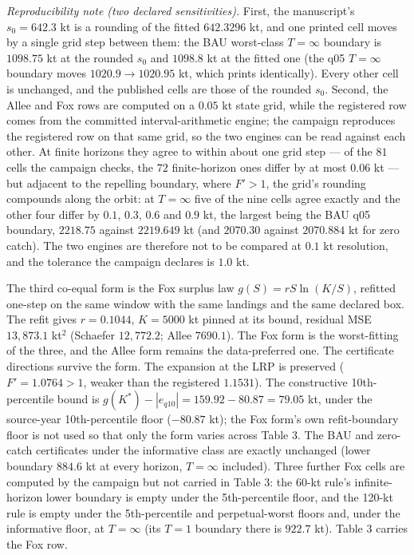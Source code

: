 \documentclass[11pt]{article}
\begin{document}
\emph{Reproducibility note (two declared sensitivities).} First, the
manuscript's \(s_0 = 642.3\) kt is a rounding of the fitted
\(642.3296\) kt, and one printed cell moves by a single grid step between
them: the BAU worst-class \(T=\infty\) boundary is \(1098.75\) kt at the
rounded \(s_0\) and \(1098.8\) kt at the fitted one (the q05
\(T=\infty\) boundary moves \(1020.9 \to 1020.95\) kt, which prints
identically). Every other cell is unchanged, and the published cells are
those of the rounded \(s_0\). Second, the Allee and Fox rows are computed
on a \(0.05\) kt state grid, while the registered row comes from the
committed interval-arithmetic engine; the campaign reproduces the
registered row on that same grid, so the two engines can be read against
each other. At finite horizons they agree to within about one grid step
--- of the \(81\) cells the campaign checks, the \(72\) finite-horizon
ones differ by at most \(0.06\) kt --- but adjacent to the repelling
boundary, where \(F' > 1\), the grid's rounding compounds along the orbit:
at \(T = \infty\) five of the nine cells agree exactly and the other
four differ by \(0.1\), \(0.3\), \(0.6\) and \(0.9\) kt, the largest
being the BAU q05 boundary, \(2218.75\) against \(2219.649\) kt (and
\(2070.30\) against \(2070.884\) kt for zero catch). The two engines are
therefore not to be compared at \(0.1\) kt resolution, and the tolerance
the campaign declares is \(1.0\) kt.

The third co-equal form is the Fox surplus law \(g(S) = rS\ln(K/S)\),
refitted one-step on the same window with the same landings and the same
declared box. The refit gives \(r = 0.1044\), \(K = 5000\) kt pinned at
its bound, residual MSE \(13{,}873.1\) kt\(^2\) (Schaefer
\(12{,}772.2\); Allee \(7690.1\)). The Fox form is the worst-fitting of
the three, and the Allee form remains the data-preferred one. The
certificate directions survive the form. The expansion at the LRP is
preserved (\(F' = 1.0764 > 1\), weaker than the registered \(1.1531\)).
The constructive 10th-percentile bound is
\(g(K^*) - |e_{q10}| = 159.92 - 80.87 = 79.05\) kt, under the
source-year 10th-percentile floor (\(-80.87\) kt); the Fox form's own
refit-boundary floor is not used so that only the form varies across
Table 3. The BAU and zero-catch certificates under the informative class
are exactly unchanged (lower boundary \(884.6\) kt at every horizon,
\(T=\infty\) included). Three further Fox cells are computed by the campaign but not carried in
Table 3: the 60-kt rule's infinite-horizon lower boundary is empty under
the 5th-percentile floor, and the 120-kt rule is empty under the
5th-percentile and perpetual-worst floors and, under the informative
floor, at \(T=\infty\) (its \(T=1\) boundary there is \(922.7\) kt). Table 3 carries the Fox row.
\end{document}
